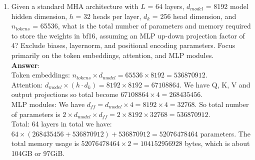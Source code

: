 \documentclass[11pt]{article}
\begin{document}
\begin{enumerate}
\item[5.]  Given a standard MHA architecture with $L$ = 64 layers, $d_{model}$ = 8192 model hidden dimension, $h$ = 32 heads per layer, $d_k$ = 256 head dimension, and $n_{tokens}$ = 65536, what is the total number of parameters and memory required to store the weights in bf16, assuming an MLP up-down projection factor of 4? Exclude biases, layernorm, and positional encoding parameters. Focus primarily on the token embeddings, attention, and MLP modules. \\
\textbf{Answer}: \\
Token embeddings: $n_{tokens} \times d_{model} = 65536 \times 8192 = 536870912$. \\
Attention: $d_{model} \times (h \cdot d_k) = 8192 \times 8192 = 67108864$. We have Q, K, V and output projections so total become $67108864 \times 4 = 268435456$. \\
MLP modules: We have $d_{ff} = d_{model} \times 4 = 8192 \times 4 = 32768$. So total number of parameters is $2 \times d_{model} \times d_{ff} = 2 \times 8192 \times 32768 = 536870912$. \\
Total: 64 layers in total we have: $64 \times (268435456 + 536870912) + 536870912 = 52076478464$ parameters. The total memory usage is $52076478464 \times 2 = 104152956928$ bytes, which is about 104GB or 97GiB.

\end{enumerate}
\end{document}
